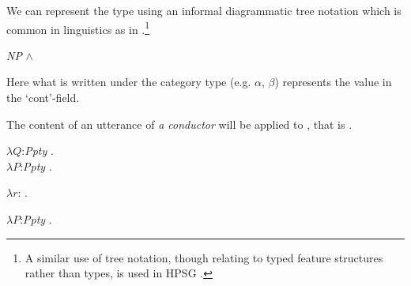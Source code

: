 We can represent the type  using an informal diagrammatic
tree notation which is common in linguistics as in
.\footnote{A similar use of tree notation, though relating
  to typed feature structures rather than types, is used in HPSG
  \citep[see, for example,][Chapter~2]{GinzburgSag2000}.}
\begin{ex} 
\begin{subex} 
 
\item \hspace*{1em}\textit{NP} \d{$\wedge$}


 
\item {}
 
\end{subex} 
   
\end{ex}
Here what is written under the category type (e.g. $\alpha$, $\beta$) represents the value in
the `cont'-field. 
     
The content of an utterance of \textit{a conductor}
will be  applied to , that is .
\begin{ex} 
\begin{subex} 
 
\item  $\lambda Q$:\textit{Ppty} . \\
\hspace*{1em} $\lambda P$:\textit{Ppty}
. 
 
\item $\lambda
r$:
.  

\item $\lambda P$:\textit{Ppty}
. 
 
\end{subex} 
\label{ex:a-conductor}   
\end{ex} 

